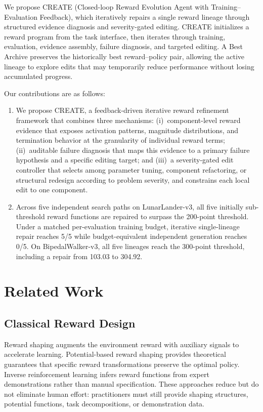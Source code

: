 \documentclass[letterpaper,twocolumn,10pt]{article}
\begin{document}
We propose CREATE (Closed-loop Reward Evolution Agent with Training--Evaluation Feedback), which iteratively repairs a single reward lineage through structured evidence diagnosis and severity-gated editing. CREATE initializes a reward program from the task interface, then iterates through training, evaluation, evidence assembly, failure diagnosis, and targeted editing. A Best Archive preserves the historically best reward--policy pair, allowing the active lineage to explore edits that may temporarily reduce performance without losing accumulated progress.

Our contributions are as follows:
\begin{enumerate}
    \item We propose CREATE, a feedback-driven iterative reward refinement framework that combines three mechanisms: (i)~component-level reward evidence that exposes activation patterns, magnitude distributions, and termination behavior at the granularity of individual reward terms; (ii)~auditable failure diagnosis that maps this evidence to a primary failure hypothesis and a specific editing target; and (iii)~a severity-gated edit controller that selects among parameter tuning, component refactoring, or structural redesign according to problem severity, and constrains each local edit to one component.
    \item Across five independent search paths on LunarLander-v3, all five initially sub-threshold reward functions are repaired to surpass the 200-point threshold. Under a matched per-evaluation training budget, iterative single-lineage repair reaches 5/5 while budget-equivalent independent generation reaches 0/5. On BipedalWalker-v3, all five lineages reach the 300-point threshold, including a repair from 103.03 to 304.92.
\end{enumerate}

\section{Related Work}

\subsection{Classical Reward Design}

Reward shaping augments the environment reward with auxiliary signals to accelerate learning. Potential-based reward shaping \cite{ng1999policy,wiewiora2003potential} provides theoretical guarantees that specific reward transformations preserve the optimal policy. Inverse reinforcement learning \cite{ng2000algorithms,abbeel2004apprenticeship,ziebart2008maximum} infers reward functions from expert demonstrations rather than manual specification. These approaches reduce but do not eliminate human effort: practitioners must still provide shaping structures, potential functions, task decompositions, or demonstration data.
\end{document}
